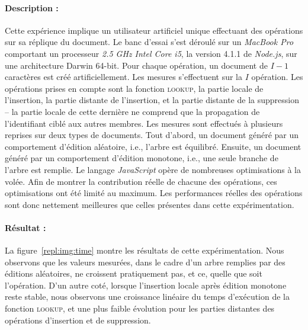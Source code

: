\paragraph{Description :} Cette expérience implique un utilisateur artificiel
unique effectuant des opérations sur sa réplique du document. Le banc d'essai
s'est déroulé sur un \emph{MacBook Pro} comportant un processeur \emph{2.5 GHz
  Intel Core i5}, la version 4.1.1 de \emph{Node.js}, sur une architecture
Darwin 64-bit. Pour chaque opération, un document de $I-1$ caractères est créé
artificiellement. Les mesures s'effectuent sur la $I$ opération. Les
opérations prises en compte sont la fonction \textsc{lookup}, la partie locale
de l'insertion, la partie distante de l'insertion, et la partie distante de la
suppression -- la partie locale de cette dernière ne comprend que la propagation
de l'identifiant ciblé aux autres membres. Les mesures sont effectués à
plusieurs reprises sur deux types de documents. Tout d'abord, un document généré
par un comportement d'édition aléatoire, i.e., l'arbre \LSEQ est
équilibré. Ensuite, un document généré par un comportement d'édition monotone,
i.e., une seule branche de l'arbre \LSEQ est remplie. 
Le langage \emph{JavaScript} opère de nombreuses optimisations à la volée. Afin
de montrer la contribution réelle de chacune des opérations, ces optimisations
ont été limité au maximum. Les performances réelles des opérations sont donc
nettement meilleures que celles présentes dans cette expérimentation.

\paragraph{Résultat :} La figure~\ref{repl:img:time} montre les résultats de
cette expérimentation. Nous observons que les valeurs mesurées, dans le cadre
d'un arbre remplies par des éditions aléatoires, ne croissent pratiquement pas,
et ce, quelle que soit l'opération. D'un autre coté, lorsque l'insertion locale
après édition monotone reste stable, nous observons une croissance linéaire du
temps d'exécution de la fonction \textsc{lookup}, et une plus faible évolution
pour les parties distantes des opérations d'insertion et de suppression.

